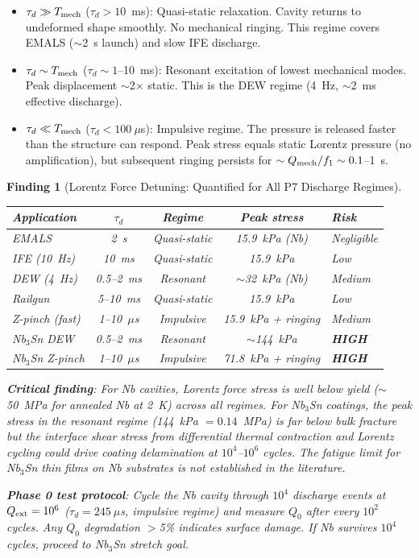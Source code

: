 \documentclass[11pt]{article}
\newtheorem{finding}{Finding}
\begin{document}
\begin{itemize}[nosep]
  \item $\tau_d \gg T_{\rm mech}$ ($\tau_d > 10$~ms): Quasi-static
    relaxation. Cavity returns to undeformed shape smoothly. No
    mechanical ringing. This regime covers EMALS ($\sim$2~s launch)
    and slow IFE discharge.
  \item $\tau_d \sim T_{\rm mech}$ ($\tau_d \sim 1$--10~ms):
    Resonant excitation of lowest mechanical modes. Peak
    displacement $\sim$2$\times$ static. This is the DEW regime
    (4~Hz, $\sim$2~ms effective discharge).
  \item $\tau_d \ll T_{\rm mech}$ ($\tau_d < 100~\mu$s): Impulsive
    regime. The pressure is released faster than the structure
    can respond. Peak stress equals static Lorentz pressure
    (no amplification), but subsequent ringing persists for
    $\sim Q_{\rm mech}/f_1 \sim 0.1$--1~s.
\end{itemize}

\begin{finding}[Lorentz Force Detuning: Quantified for All P7 Discharge Regimes]
\label{find:LFD-regimes}

\begin{center}
\begin{tabular}{lcccl}
\toprule
Application & $\tau_d$ & Regime & Peak stress & Risk \\
\midrule
EMALS & 2~s & Quasi-static & 15.9~kPa (Nb) & Negligible \\
IFE (10~Hz) & 10~ms & Quasi-static & 15.9~kPa & Low \\
DEW (4~Hz) & 0.5--2~ms & Resonant & $\sim$32~kPa (Nb) & Medium \\
Railgun & 5--10~ms & Quasi-static & 15.9~kPa & Low \\
Z-pinch (fast) & 1--10~$\mu$s & Impulsive & 15.9~kPa + ringing & Medium \\
\midrule
Nb$_3$Sn DEW & 0.5--2~ms & Resonant & $\sim$144~kPa & \textbf{HIGH} \\
Nb$_3$Sn Z-pinch & 1--10~$\mu$s & Impulsive & 71.8~kPa + ringing & \textbf{HIGH} \\
\bottomrule
\end{tabular}
\end{center}

\textbf{Critical finding}: For Nb cavities, Lorentz force stress
is well below yield ($\sim$50~MPa for annealed Nb at 2~K) across
all regimes. For Nb$_3$Sn coatings, the peak stress in the
resonant regime (144~kPa $= 0.14$~MPa) is far below bulk fracture
but the \emph{interface shear stress} from differential thermal
contraction and Lorentz cycling could drive coating delamination
at $10^4$--$10^6$ cycles. The fatigue limit for Nb$_3$Sn thin
films on Nb substrates is not established in the literature.

\textbf{Phase 0 test protocol}: Cycle the Nb cavity through
$10^4$ discharge events at $Q_{\rm ext} = 10^6$ ($\tau_d = 245~\mu$s,
impulsive regime) and measure $Q_0$ after every $10^2$ cycles.
Any $Q_0$ degradation $>$5\% indicates surface damage. If Nb
survives $10^4$ cycles, proceed to Nb$_3$Sn stretch goal.
\end{finding}
\end{document}
